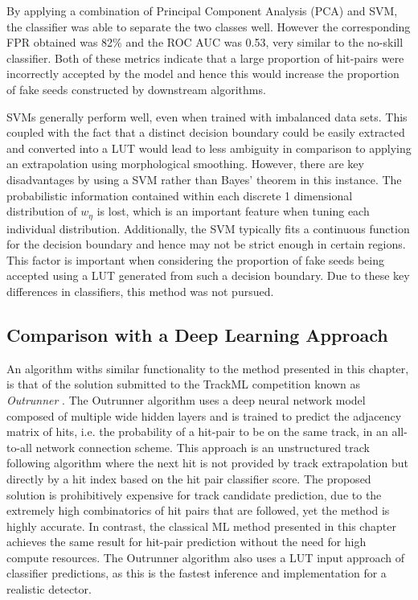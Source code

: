 By applying a combination of Principal Component Analysis (PCA) and SVM, the classifier was able to separate the two classes well. However the corresponding FPR obtained was 82\% and the ROC AUC was 0.53, very similar to the no-skill classifier. Both of these metrics indicate that a large proportion of hit-pairs were incorrectly accepted by the model and hence this would increase the proportion of fake seeds constructed by downstream algorithms.

SVMs generally perform well, even when trained with imbalanced data sets. This coupled with the fact that a distinct decision boundary could be easily extracted and converted into a LUT would lead to less ambiguity in comparison to applying an extrapolation using morphological smoothing. However, there are key disadvantages by using a SVM rather than Bayes' theorem in this instance. The probabilistic information contained within each discrete 1 dimensional distribution of $w_{\eta}$ is lost, which is an important feature when tuning each individual distribution. Additionally, the SVM typically fits a continuous function for the decision boundary and hence may not be strict enough in certain regions. This factor is important when considering the proportion of fake seeds being accepted using a LUT generated from such a decision boundary. Due to these key differences in classifiers, this method was not pursued.


\subsection{Comparison with a Deep Learning Approach}


An algorithm withs similar functionality to the method presented in this chapter, is that of the solution submitted to the TrackML competition known as \textit{Outrunner} \cite{Amrouche_2019}. The Outrunner algorithm uses a deep neural network model composed of multiple wide hidden layers and is trained to predict the adjacency matrix of hits, i.e. the probability of a hit-pair to be on the same track, in an all-to-all network connection scheme. This approach is an unstructured track following algorithm where the next hit is not provided by track extrapolation but directly by a hit index based on the hit pair classifier score. The proposed solution is prohibitively expensive for track candidate prediction, due to the extremely high combinatorics of hit pairs that are followed, yet the method is highly accurate. In contrast, the classical ML method presented in this chapter achieves the same result for hit-pair prediction without the need for high compute resources. The Outrunner algorithm also uses a LUT input approach of classifier predictions, as this is the fastest inference and implementation for a realistic detector.

